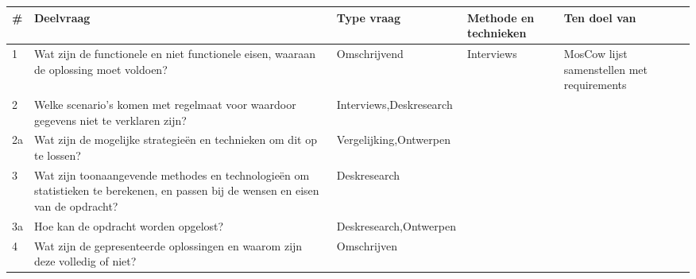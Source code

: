 \begin{center}
\begin{tabular}{|l|p{4cm}|p{2.5cm} |p{2.5cm}|p{4cm}|}
\hline
\textbf{\#} & \textbf{Deelvraag} & \textbf{Type vraag} & \textbf{Methode en technieken} & \textbf{Ten doel van} \\
\hline
1 & Wat zijn de functionele en niet functionele eisen, waaraan de oplossing moet voldoen? & Omschrijvend & Interviews & MosCow lijst samenstellen met requirements \\
\hline
2 & Welke scenario's komen met regelmaat voor waardoor gegevens niet te verklaren zijn? & Interviews,\newline Deskresearch
 &  & \\
\hline
2a & Wat zijn de mogelijke strategieën en technieken om dit op te lossen? & Vergelijking,\newline Ontwerpen & & \\
\hline
3 & Wat zijn toonaangevende methodes en technologieën om statistieken te berekenen, en passen bij de wensen en eisen van de opdracht? & Deskresearch & & \\
\hline
3a & Hoe kan de opdracht worden opgelost? & Deskresearch,\newline Ontwerpen & & \\
\hline
4 & Wat zijn de gepresenteerde oplossingen en waarom zijn deze volledig of niet? & Omschrijven & & \\
\hline
\end{tabular}
\end{center}